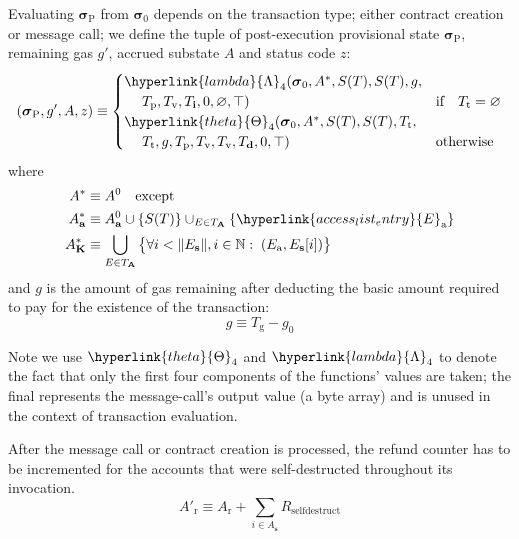 \documentclass[9pt,oneside]{amsart}
\begin{document}
\begin{multicols}{2}
Evaluating $\boldsymbol{\sigma}_{\mathrm{P}}$ from $\boldsymbol{\sigma}_0$ depends on the transaction type; either contract creation or message call; we define the tuple of post-execution provisional state $\boldsymbol{\sigma}_{\mathrm{P}}$, remaining gas $g'$, accrued substate $A$ and status code $z$:
\begin{equation}
(\boldsymbol{\sigma}_{\mathrm{P}}, g', A, z) \equiv \begin{cases}
\hyperlink{lambda}{\Lambda}_{4}(\boldsymbol{\sigma}_0, A^*, S(T), S(T), g, &\\ \quad\; T_{\mathrm{p}}, T_{\mathrm{v}}, T_{\mathbf{i}}, 0, \varnothing, \top) & \text{if} \quad T_{\mathrm{t}} = \varnothing \\
\hyperlink{theta}{\Theta}_{4}(\boldsymbol{\sigma}_0, A^*, S(T), S(T), T_{\mathrm{t}}, &\\ \quad\; T_{\mathrm{t}}, g, T_{\mathrm{p}}, T_{\mathrm{v}}, T_{\mathrm{v}}, T_{\mathbf{d}}, 0, \top) & \text{otherwise}
\end{cases}
\end{equation}
where
\begin{align}
A^* & \equiv A^0 \quad \text{except} \\
A^*_{\mathbf{a}} & \equiv A^0_{\mathbf{a}} \cup \{S(T)\} \cup_{E \in T_{\mathbf{A}}} \{ \hyperlink{access_list_entry}{E}_{\mathrm{a}} \} \\
A^*_{\mathbf{K}} & \equiv \bigcup_{E \in T_{\mathbf{A}}} \big\{ \forall i < \lVert E_{\mathbf{s}} \rVert, i \in \mathbb{N}: \; (E_{\mathrm{a}}, E_{\mathbf{s}}[i]) \big\}
\end{align}
and $g$ is the amount of gas remaining after deducting the basic amount required to pay for the existence of the transaction:
\begin{equation}
g \equiv T_{\mathrm{g}} - g_0
\end{equation}

Note we use $\hyperlink{theta}{\Theta}_{4}$ and $\hyperlink{lambda}{\Lambda}_{4}$ to denote the fact that only the first four components of the functions' values are taken; the final represents the message-call's output value (a byte array) and is unused in the context of transaction evaluation.

After the message call or contract creation is processed, the refund counter has to be incremented for the accounts that were self-destructed throughout its invocation.
\begin{equation}
	A'_{\mathrm{r}} \equiv A_{\mathrm{r}} + \sum_{i \in A_{\mathbf{s}}} R_{\mathrm{selfdestruct}}
\end{equation}


\end{multicols}
\end{document}

